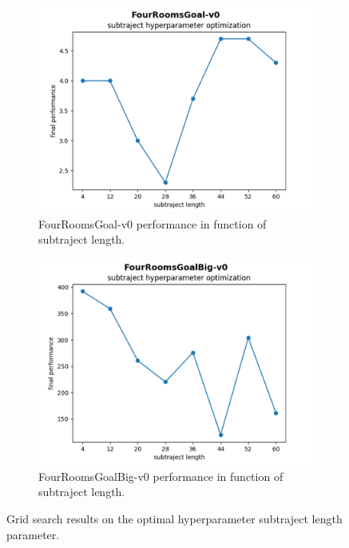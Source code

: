 \documentclass[conference]{IEEEtran}
\begin{document}
\begin{figure}[ht]
\centering
\begin{subfigure}[t]{0.45\columnwidth}
\centering
\includegraphics[width=1.0\textwidth]{img/exp_tabular_her_gridsearch_small.png}
\caption{FourRoomsGoal-v0 performance in function of subtraject length.}
\label{fig:experiment_subtraject_gridsearch_small}
\end{subfigure}
\hspace{0em}
\begin{subfigure}[t]{0.45\columnwidth}
\centering
\includegraphics[width=1.0\textwidth]{img/exp_tabular_her_gridsearch_big.png}
\caption{FourRoomsGoalBig-v0 performance in function of subtraject length.}
\label{fig:experiment_subtraject_gridsearch_big}
\end{subfigure}
\caption{Grid search results on the optimal hyperparameter subtraject length parameter.}
\label{fig:experiment_subtraject_gridsearch}
\end{figure}
\end{document}
